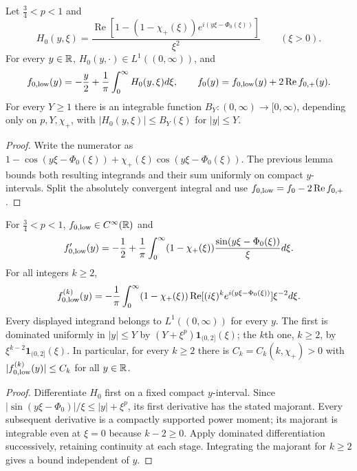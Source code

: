 \begin{lemma}
  \label{lem:c04_seed_low_representation}
  Let $\frac34<p<1$ and
  \[
    H_0(y,\xi)=\frac{\operatorname{Re}[1-(1-\chi_+(\xi))e^{i(y\xi-\Phi_0(\xi))}]}{\xi^2}
      \qquad(\xi>0).
  \]
  For every $y\in\mathbb{R}$, $H_0(y,\cdot)\in L^1((0,\infty))$, and
  \[
    f_{0,\textup{low}}(y)=-\frac y2+\frac1\pi\int_0^\infty H_0(y,\xi)d\xi,
    \qquad f_0(y)=f_{0,\textup{low}}(y)+2\operatorname{Re}f_{0,+}(y).
  \]
  For every $Y\ge1$ there is an integrable function $B_Y:(0,\infty)\to[0,\infty)$,
  depending only on $p,Y,\chi_+$, with $|H_0(y,\xi)|\le B_Y(\xi)$ for $|y|\le Y$.
\end{lemma}
\begin{proof}
  Write the numerator as
  $1-\cos(y\xi-\Phi_0(\xi))+\chi_+(\xi)\cos(y\xi-\Phi_0(\xi))$.
  The previous lemma bounds both resulting integrands and their sum uniformly on compact
  $y$-intervals. Split the absolutely convergent integral and use
  $f_{0,\textup{low}}=f_0-2\operatorname{Re}f_{0,+}$.
\end{proof}

\begin{lemma}
  \label{lem:c04_seed_low_derivatives}
  For $\frac34<p<1$, $f_{0,\textup{low}}\in C^\infty(\mathbb{R})$ and
  \[
    f_{0,\textup{low}}'(y)=-\frac12+
      \frac1\pi\int_0^\infty(1-\chi_+(\xi))\frac{\sin(y\xi-\Phi_0(\xi))}{\xi}d\xi.
  \]
  For all integers $k\ge2$,
  \[
    f_{0,\textup{low}}^{(k)}(y)=-\frac1\pi\int_0^\infty
      (1-\chi_+(\xi))\operatorname{Re}[(i\xi)^ke^{i(y\xi-\Phi_0(\xi))}]\xi^{-2}d\xi.
  \]
  Every displayed integrand belongs to $L^1((0,\infty))$ for every $y$.
  The first is dominated uniformly in $|y|\le Y$ by
  $(Y+\xi^p)\mathbf1_{(0,2]}(\xi)$; the $k$th one, $k\ge2$, by
  $\xi^{k-2}\mathbf1_{(0,2]}(\xi)$.
  In particular, for every $k\ge2$ there is $C_k=C_k(k,\chi_+)>0$ with
  $|f_{0,\textup{low}}^{(k)}(y)|\le C_k$ for all $y\in\mathbb{R}$.
\end{lemma}
\begin{proof}
  Differentiate $H_0$ first on a fixed compact $y$-interval. Since
  $|\sin(y\xi-\Phi_0)|/\xi\le|y|+\xi^p$, its first derivative has the stated majorant.
  Every subsequent derivative is a compactly supported power moment; its majorant is
  integrable even at $\xi=0$ because $k-2\ge0$.
  Apply dominated differentiation successively, retaining continuity at each stage.
  Integrating the majorant for $k\ge2$ gives a bound independent of $y$.
\end{proof}


